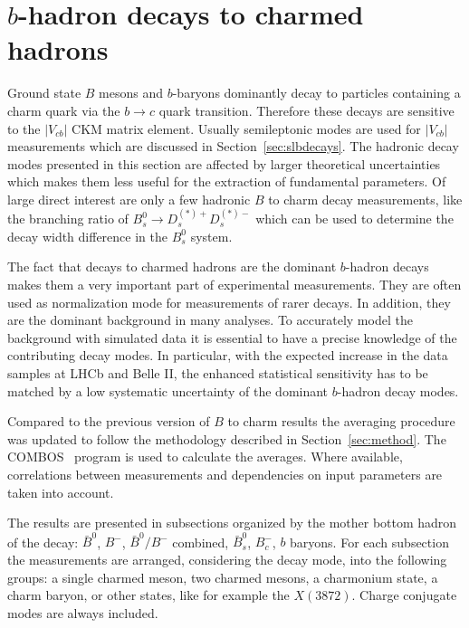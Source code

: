 \section{$b$-hadron decays to charmed hadrons}
\label{sec:b2c}
Ground state $B$ mesons and $b$-baryons dominantly decay to particles containing a charm quark via the $b \rightarrow c$ quark transition.
Therefore these decays are sensitive to the $|V_{cb}|$ CKM matrix element.
Usually semileptonic modes are used for $|V_{cb}|$ measurements which are discussed in Section~\ref{sec:slbdecays}.
The hadronic decay modes presented in this section are affected by larger theoretical uncertainties which makes them less useful for the extraction of fundamental parameters.
Of large direct interest are only a few hadronic $B$ to charm decay measurements, like the branching ratio of $B_s^0 \rightarrow D_s^{(*)+} D_s^{(*)-}$ which can be used to determine the decay width difference in the $B_s^0$ system.

The fact that decays to charmed hadrons are the dominant $b$-hadron decays makes them a very important part of experimental measurements.
They are often used as normalization mode for measurements of rarer decays.
In addition, they are the dominant background in many analyses.
To accurately model the background with simulated data it is essential to have a precise knowledge of the contributing decay modes.
In particular, with the expected increase in the data samples at LHCb and Belle II, the enhanced statistical sensitivity has to be matched by a low systematic uncertainty of the dominant $b$-hadron decay modes.

Compared to the previous version of $B$ to charm results the averaging procedure was updated to follow the methodology described in Section~\ref{sec:method}.
The COMBOS~\cite{Combos:1999} program is used to calculate the averages.
Where available, correlations between measurements and dependencies on input parameters are taken into account.

The results are presented in subsections organized by the mother bottom hadron of the decay: $\bar{B}^0$, $B^-$, $\bar{B}^0/B^-$ combined, $\bar{B}_s^0$, $B_c^-$, $b$ baryons.
For each subsection the measurements are arranged, considering the decay mode, into the following groups: a single charmed meson, two charmed mesons, a charmonium state, a charm baryon, or other states, like for example the $X(3872)$.
Charge conjugate modes are always included.
